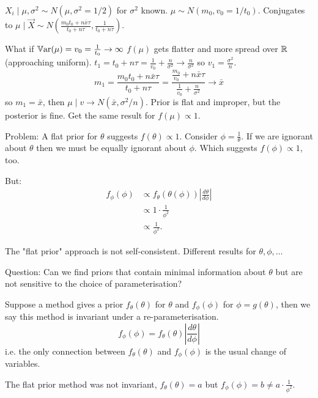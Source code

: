 \documentclass[10pt, a4paper]{article}
\begin{document}
\begin{example}
    $X_i \mid \mu, \sigma ^ 2 \sim N(\mu, \sigma ^ 2 = 1 / 2)$ for $\sigma ^ 2$ known.
    $\mu \sim N(m_0, v_0 = 1 / t_0)$.
    Conjugates to $\mu \mid \vec{X} \sim N\left(\frac{m_0t_0 + n\bar{x}\tau}{t_0 + n\tau}, \frac{1}{t_0 + n\tau}\right)$.
    
    What if $\mathbb{V}\mathrm{ar}(\mu) = v_0 = \frac{1}{t_0} \to \infty$
    $f(\mu)$ gets flatter and more spread over $\mathbb{R}$
    (approaching uniform).
    $t_1 = t_0 + n\tau = \frac{1}{v_0} + \frac{n}{\sigma ^ 2} \to \frac{n}{\sigma ^ 2}$ so $v_1 = \frac{\sigma ^ 2}{n}$.
    \[
    m_1 = \frac{m_0t_0 + n\bar{x}\tau}{t_0 + n\tau} = \frac{\frac{m_0}{v_0} + n\bar{x}\tau}{\frac{1}{v_0} + \frac{n}{\sigma ^ 2}} \to \bar{x}
    \]
    so $m_1 = \bar{x}$,
    then $\mu \mid v \to N(\bar{x}, \sigma ^ 2 / n)$.
    Prior is flat and improper,
    but the posterior is fine.
    Get the same result for $f(\mu) \propto 1$.
\end{example}

Problem:
A flat prior for $\theta$ suggests $f(\theta) \propto 1$.
Consider $\phi = \frac{1}{\theta}$.
If we are ignorant about $\theta$ then we must be equally ignorant about $\phi$.
Which suggests $f(\phi) \propto 1$,
too.

But:
\begin{align*}
    f_{\phi}(\phi) &\propto f_{\theta}(\theta(\phi))\left|\frac{d\theta}{d\phi}\right| \\
    &\propto 1 \cdot \frac{1}{\phi ^ 2} \\
    &\propto \frac{1}{\phi ^ 2}.
\end{align*}

The
"flat prior"
approach is not self-consistent.
Different results for $\theta, \phi, \dotsc$

Question:
Can we find priors that contain minimal information about $\theta$ but are not sensitive to the choice of parameterisation?

\begin{definition}
    Suppose a method gives a prior $f_{\theta}(\theta)$ for $\theta$ and $f_{\phi}(\phi)$ for $\phi = g(\theta)$,
    then we say this method is invariant under a re-parameterisation.
    \[
    f_{\phi}(\phi) = f_{\theta}(\theta)\left|\frac{d\theta}{d\phi}\right|
    \]
    i.e. the only connection between $f_{\theta}(\theta)$ and $f_{\phi}(\phi)$ is the usual change of variables.

    The flat prior method was not invariant,
    $f_{\theta}(\theta) = a$ but $f_{\phi}(\phi) = b \neq a \cdot \frac{1}{\phi ^ 2}$.
\end{definition}
\end{document}

